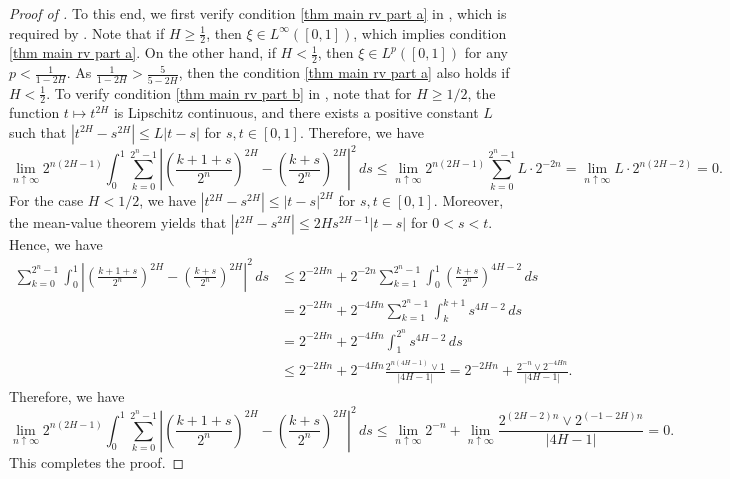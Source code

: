 \documentclass[12pt,reqno]{article}
\def\ua{\uparrow}
\numberwithin{equation}{section}
\theoremstyle{definition}
\def\ua{\uparrow}
\begin{document}
\begin{proof}[Proof of ]
	To this end, we first verify condition \ref{thm main rv part a} in , which is required by . Note that if $H \ge \frac{1}{2}$, then $\xi \in L^\infty([0,1])$, which implies condition \ref{thm main rv part a}. On the other hand, if $H < \frac{1}{2}$, then $\xi \in L^p([0,1])$ for any $p < \frac{1}{1 - 2H}$. As $\frac{1}{1 - 2H} > \frac{5}{5 - 2H}$, then the condition \ref{thm main rv part a} also holds if $H < \frac{1}{2}$. To verify condition \ref{thm main rv part b} in , note that for $H \ge 1/2$, the function $t \mapsto t^{2H}$ is Lipschitz continuous, and there exists a positive constant $L$ such that $|t^{2H} - s^{2H}| \le L|t -s|$ for $s,t \in [0,1]$. Therefore, we have
	\begin{equation*}
		\lim_{n \ua \infty} 2^{n(2H-1)}\int_0^{1}\sum_{k = 0}^{2^n-1}\left|\left(\frac{k+1+s}{2^{n}}\right)^{2H}-\left(\frac{k+s}{2^{n}}\right)^{2H}\right|^2\,ds \le \lim_{n \ua \infty} 2^{n(2H-1)} \sum_{k = 0}^{2^n-1}L\cdot 2^{-2n} = \lim_{n \ua \infty}L \cdot 2^{n(2H-2)} = 0.
	\end{equation*}
	For the case $H < 1/2$, we have $|t^{2H} - s^{2H}| \le |t-s|^{2H}$ for $s,t \in [0,1]$. Moreover, the mean-value theorem yields that $|t^{2H} - s^{2H}| \le 2H s^{2H-1} |t-s|$ for $0 < s < t$. Hence, we have 
	\begin{equation*}
		\begin{split}
			\sum_{k = 0}^{2^n-1}\int_{0}^{1}\left|\left(\frac{k+1+s}{2^{n}}\right)^{2H}-\left(\frac{k+s}{2^{n}}\right)^{2H}\right|^2\,ds &\le 2^{-2Hn} + 2^{-2n}\sum_{k = 1}^{2^n-1}\int_{0}^{1}\left(\frac{k+s}{2^n}\right)^{4H-2}\,ds\\& = 2^{-2Hn} + 2^{-4Hn}\sum_{k = 1}^{2^n-1}\int_{k}^{k+1} s^{4H-2}\, ds  \\& = 2^{-2Hn} + 2^{-4Hn}\int_{1}^{2^n} s^{4H-2}\, ds\\&\le 2^{-2Hn} +2^{-4Hn}\frac{2^{n(4H-1)}\vee1}{|4H-1|}= 2^{-2Hn} + \frac{2^{-n}\vee 2^{-4Hn}}{|4H-1|}.
		\end{split}
	\end{equation*}
	Therefore, we have 
	\begin{equation*}
		\lim_{n \ua \infty}2^{n(2H-1)}\int_0^{1}\sum_{k = 0}^{2^n-1}\left|\left(\frac{k+1+s}{2^{n}}\right)^{2H}-\left(\frac{k+s}{2^{n}}\right)^{2H}\right|^2\,ds \le \lim_{n \ua \infty} 2^{-n} +\lim_{n \ua \infty} \frac{2^{(2H-2)n} \vee 2^{(-1-2H)n}}{|4H-1|}  = 0.
	\end{equation*}
	This completes the proof.
\end{proof}
\end{document}
